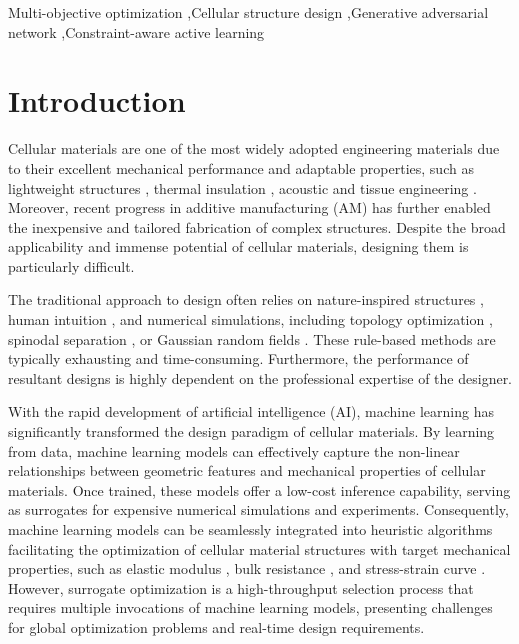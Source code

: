 \documentclass[preprint,review,12pt,authoryear]{elsarticle}
\begin{document}
\begin{frontmatter}
\begin{keyword}

Multi-objective optimization \sep Cellular structure design \sep Generative adversarial network \sep Constraint-aware active learning
\end{keyword}

\end{frontmatter}


\section{Introduction}
Cellular materials are one of the most widely adopted engineering materials due to their excellent mechanical performance and adaptable properties, such as lightweight structures \citep{Schaedler2011, Berger2017, Han2015, Tancogne-Dejean2018}, thermal insulation \citep{Li2021d}, acoustic \citep{Sekar2024} and tissue engineering \citep{Li2024c,Peng2023,Tabrizian2024}. Moreover,  recent progress in additive manufacturing (AM) has further enabled the inexpensive and tailored fabrication of complex structures. Despite the broad applicability and immense potential of cellular materials, designing them is particularly difficult.

The traditional approach to design often relies on nature-inspired structures \citep{Fernandes2021,Bandyopadhyay2021,Sethi2023}, human intuition \citep{Schaedler2011,Berger2017,Xu2016a}, and numerical simulations, including topology optimization \citep{Andersen2019,Bendsoe1999,Collet2018}, spinodal separation \citep{Hsieh2019,Roding2022}, or Gaussian random fields \citep{Kumar2020,Zheng2020abc}. These rule-based methods are typically exhausting and time-consuming. Furthermore, the performance of resultant designs is highly dependent on the professional expertise of the designer.
 
With the rapid development of artificial intelligence (AI), machine learning has significantly transformed the design paradigm of cellular materials. By learning from data, machine learning models can effectively capture the non-linear relationships between geometric features and mechanical properties of cellular materials. Once trained, these models offer a low-cost inference capability, serving as surrogates for expensive numerical simulations and experiments. Consequently, machine learning models can be seamlessly integrated into heuristic algorithms facilitating the optimization of cellular material structures with target mechanical properties, such as elastic modulus \citep{Garland2021,Lee2022,Chen2024b}, bulk resistance \citep{Liu2020a}, and stress-strain curve \citep{Deng2022a,Ma2020b}.  However, surrogate optimization is a high-throughput selection process that requires multiple invocations of machine learning models, presenting challenges for global optimization problems and real-time design requirements.
\end{document}
